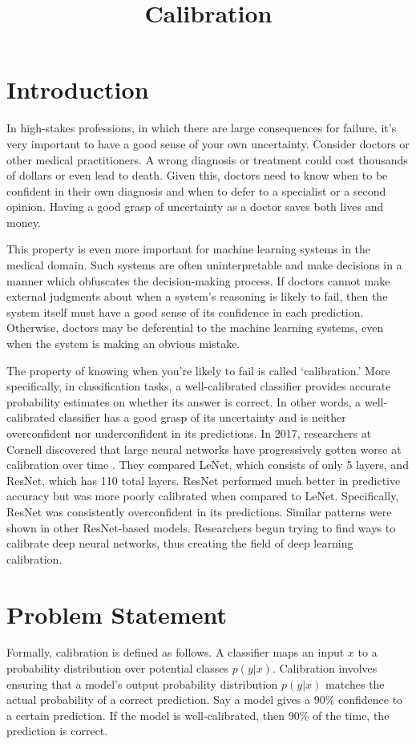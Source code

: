 \documentclass{article}
\title{Calibration}
\begin{document}
\maketitle

\section{Introduction}
In high-stakes professions, in which there are large consequences for failure, it’s very important to have a good sense of your own uncertainty. Consider doctors or other medical practitioners. A wrong diagnosis or treatment could cost thousands of dollars or even lead to death. Given this, doctors need to know when to be confident in their own diagnosis and when to defer to a specialist or a second opinion. Having a good grasp of uncertainty as a doctor saves both lives and money. 

This property is even more important for machine learning systems in the medical domain. Such systems are often uninterpretable and make decisions in a manner which obfuscates the decision-making process. If doctors cannot make external judgments about when a system's reasoning is likely to fail, then the system itself must have a good sense of its confidence in each prediction. Otherwise, doctors may be deferential to the machine learning systems, even when the system is making an obvious mistake.

The property of knowing when you’re likely to fail is called `calibration.' More specifically, in classification tasks, a well-calibrated classifier provides accurate probability estimates on whether its answer is correct. In other words, a well-calibrated classifier has a good grasp of its uncertainty and is neither overconfident nor underconfident in its predictions. In 2017, researchers at Cornell discovered that large neural networks have progressively gotten worse at calibration over time \cite{guo2017calibration}. They compared LeNet, which consists of only 5 layers, and ResNet, which has 110 total layers. ResNet performed much better in predictive accuracy but was more poorly calibrated when compared to LeNet. Specifically, ResNet was consistently overconfident in its predictions. Similar patterns were shown in other ResNet-based models. Researchers begun trying to find ways to calibrate deep neural networks, thus creating the field of deep learning calibration.

\section{Problem Statement}
Formally, calibration is defined as follows. A classifier maps an input $x$ to a probability distribution over potential classes $p(y|x)$. Calibration involves ensuring that a model’s output probability distribution $p(y|x)$ matches the actual probability of a correct prediction. Say a model gives a 90\% confidence to a certain prediction. If the model is well-calibrated, then 90\% of the time, the prediction is correct. 
\end{document}
